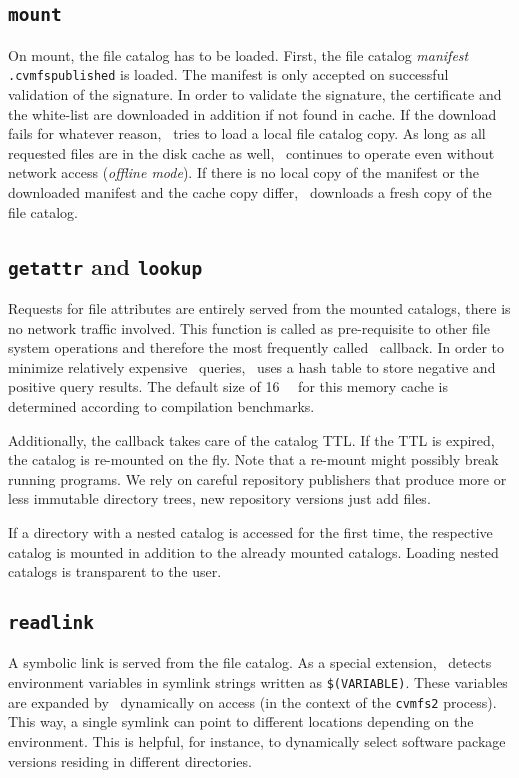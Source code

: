 \subsection{\tt mount}
On mount, the file catalog has to be loaded.
First, the file catalog \emph{manifest} \texttt{.cvmfspublished} is loaded.
The manifest is only accepted on successful validation of the signature.
In order to validate the signature, the certificate and the white-list are downloaded in addition if not found in cache.
If the download fails for whatever reason, \cvmfs\ tries to load a local file catalog copy.
As long as all requested files are in the disk cache as well, \cvmfs\ continues to operate even without network access (\emph{offline mode}).
If there is no local copy of the manifest or the downloaded manifest and the cache copy differ, \cvmfs\ downloads a fresh copy of the file catalog.

\subsection{{\tt getattr} and {\tt lookup}}
Requests for file attributes are entirely served from the mounted catalogs, \ie there is no network traffic involved.
This function is called as pre-requisite to other file system operations and therefore the most frequently called \fuse\ callback.
In order to minimize relatively expensive \sqlite\ queries, \cvmfs\ uses a hash table to store negative and positive query results.
The default size of \SI{16}{\mega\byte} for this memory cache is determined according to compilation benchmarks.

Additionally, the callback takes care of the catalog TTL.
If the TTL is expired, the catalog is re-mounted on the fly.
Note that a re-mount might possibly break running programs.
We rely on careful repository publishers that produce more or less immutable directory trees, \ie new repository versions just add files.

If a directory with a nested catalog is accessed for the first time, the respective catalog is mounted in addition to the already mounted catalogs.
Loading nested catalogs is transparent to the user.

\subsection{\tt readlink}
A symbolic link is served from the file catalog.
As a special extension, \cvmfs\ detects environment variables in symlink strings written as \texttt{\$(VARIABLE)}.
These variables are expanded by \cvmfs\ dynamically on access (in the context of the \texttt{cvmfs2} process).
This way, a single symlink can point to different locations depending on the environment.
This is helpful, for instance, to dynamically select software package versions residing in different directories.

